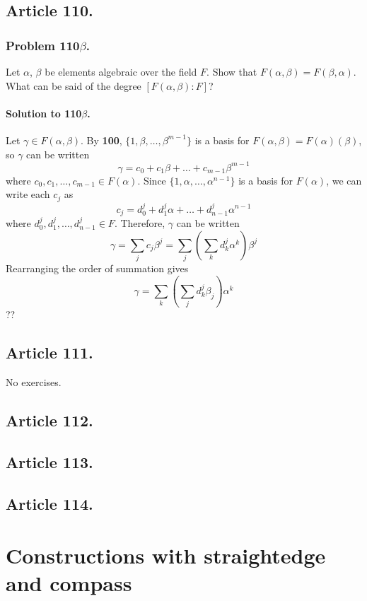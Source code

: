 \subsection{Article 110.}

\subsubsection{Problem 110$\beta$.}
Let $\alpha$, $\beta$ be elements algebraic over the field $F$. Show that
$F(\alpha, \beta) = F(\beta, \alpha)$. What can be said of the degree
$[F(\alpha, \beta) : F]$?

\paragraph*{Solution to 110$\beta$.}
Let $\gamma \in F(\alpha, \beta)$. By \textbf{100},
$\{ 1, \beta, \dots, \beta^{m-1} \}$ is a basis for
$F(\alpha, \beta) = F(\alpha)(\beta)$, so $\gamma$ can be written
$$\gamma = c_0 + c_1 \beta + \dots + c_{m-1} \beta^{m-1}$$
where $c_0, c_1, \dots, c_{m-1} \in F(\alpha)$. Since
$\{ 1, \alpha, \dots, \alpha^{n-1} \}$ is a basis for $F(\alpha)$, we
can write each $c_j$ as
$$ c_j = d_0^j + d_1^j \alpha + \dots + d_{n-1}^j \alpha^{n-1} $$
where $d_0^j, d_1^j, \dots, d_{n-1}^j \in F$. Therefore, $\gamma$ can be written
$$\gamma = \sum_j c_j \beta^j = \sum_j \left( \sum_k d_k^j \alpha^k \right) \beta^j $$
Rearranging the order of summation gives
$$\gamma = \sum_k \left( \sum_j d_k^j \beta_j \right) \alpha^k$$
??
\subsection{Article 111.}

No exercises.
\subsection{Article 112.}

\subsection{Article 113.}

\subsection{Article 114.}


\section{Constructions with straightedge and compass}



